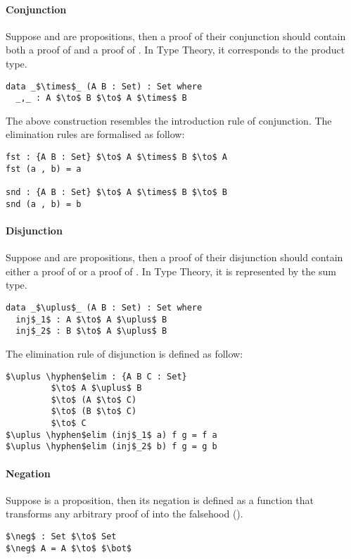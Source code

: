 \paragraph{Conjunction} Suppose  and  are propositions, then a
proof of their conjunction  should contain both a proof of  and a proof
of . In Type Theory, it corresponds to the product type. 
\begin{lstlisting}[mathescape=true,xleftmargin=.3\textwidth]
data _$\times$_ (A B : Set) : Set where
  _,_ : A $\to$ B $\to$ A $\times$ B
\end{lstlisting} 

\par The above construction resembles the introduction rule of
conjunction. The elimination rules are formalised as follow:
\begin{lstlisting}[mathescape=true,xleftmargin=.3\textwidth]
fst : {A B : Set} $\to$ A $\times$ B $\to$ A
fst (a , b) = a

snd : {A B : Set} $\to$ A $\times$ B $\to$ B
snd (a , b) = b
\end{lstlisting} 

\paragraph{Disjunction} Suppose  and  are propositions, then a
proof of their disjunction  should contain either a proof of  or a
proof of . In Type Theory, it is represented by the sum type. 
\begin{lstlisting}[mathescape=true,xleftmargin=.3\textwidth]
data _$\uplus$_ (A B : Set) : Set where
  inj$_1$ : A $\to$ A $\uplus$ B
  inj$_2$ : B $\to$ A $\uplus$ B
\end{lstlisting} 

\par The elimination rule of disjunction is defined as follow: 
\begin{lstlisting}[mathescape=true,xleftmargin=.3\textwidth]
$\uplus \hyphen$elim : {A B C : Set} 
         $\to$ A $\uplus$ B 
         $\to$ (A $\to$ C) 
         $\to$ (B $\to$ C) 
         $\to$ C
$\uplus \hyphen$elim (inj$_1$ a) f g = f a
$\uplus \hyphen$elim (inj$_2$ b) f g = g b
\end{lstlisting} 

\paragraph{Negation} Suppose  is a proposition, then its negation is
defined as a function that transforms any arbitrary proof of  into
the falsehood (\mb{\bot}). 
\begin{lstlisting}[mathescape=true,xleftmargin=.3\textwidth]
$\neg$ : Set $\to$ Set
$\neg$ A = A $\to$ $\bot$
\end{lstlisting} 


